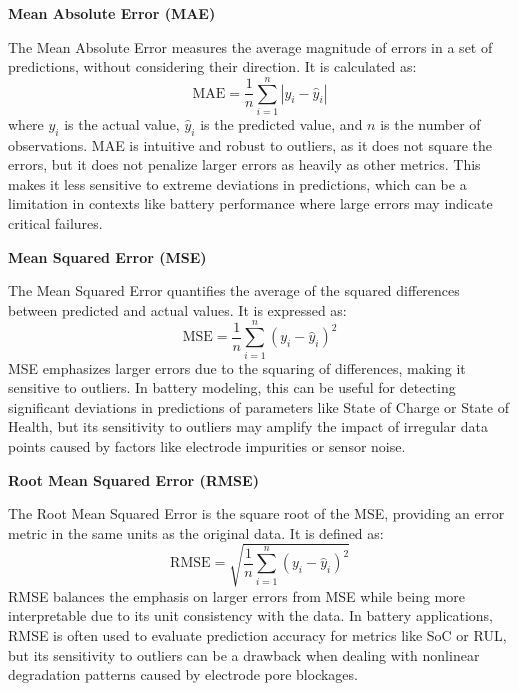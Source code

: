 \textbf{Mean Absolute Error (MAE)}

The Mean Absolute Error measures the average magnitude of errors in a set of predictions, without considering their direction. It is calculated as:
\begin{equation}
\text{MAE} = \frac{1}{n} \sum_{i=1}^{n} |y_i - \hat{y}_i|
\end{equation}
where $y_i$ is the actual value, $\hat{y}_i$ is the predicted value, and $n$ is the number of observations. MAE is intuitive and robust to outliers, as it does not square the errors, but it does not penalize larger errors as heavily as other metrics. This makes it less sensitive to extreme deviations in predictions, which can be a limitation in contexts like battery performance where large errors may indicate critical failures.

\vspace{1cm}

\textbf{Mean Squared Error (MSE)}

The Mean Squared Error quantifies the average of the squared differences between predicted and actual values. It is expressed as:
\begin{equation}
\text{MSE} = \frac{1}{n} \sum_{i=1}^{n} (y_i - \hat{y}_i)^2
\end{equation}
MSE emphasizes larger errors due to the squaring of differences, making it sensitive to outliers. In battery modeling, this can be useful for detecting significant deviations in predictions of parameters like State of Charge or State of Health, but its sensitivity to outliers may amplify the impact of irregular data points caused by factors like electrode impurities or sensor noise.

\vspace{1cm}

\textbf{Root Mean Squared Error (RMSE)}

The Root Mean Squared Error is the square root of the MSE, providing an error metric in the same units as the original data. It is defined as:
\begin{equation}
\text{RMSE} = \sqrt{\frac{1}{n} \sum_{i=1}^{n} (y_i - \hat{y}_i)^2}
\end{equation}
RMSE balances the emphasis on larger errors from MSE while being more interpretable due to its unit consistency with the data. In battery applications, RMSE is often used to evaluate prediction accuracy for metrics like SoC or RUL, but its sensitivity to outliers can be a drawback when dealing with nonlinear degradation patterns caused by electrode pore blockages.

